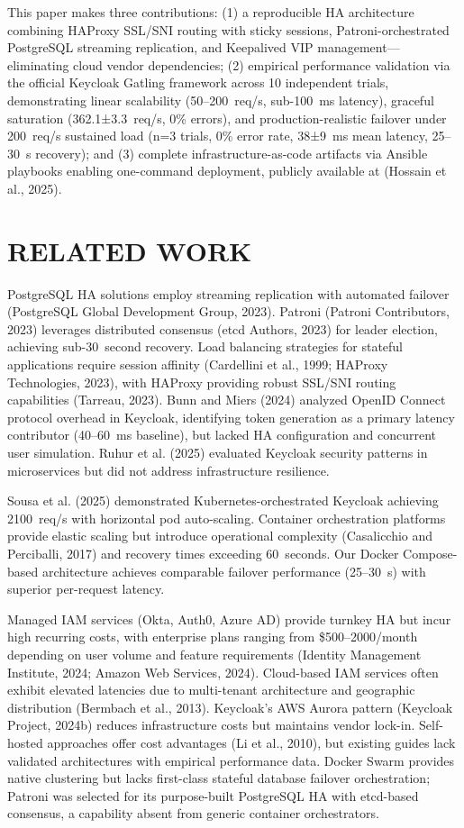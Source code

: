 \documentclass[a4paper,twoside]{article}
\begin{document}
This paper makes three contributions: (1) a reproducible HA architecture combining HAProxy SSL/SNI routing with sticky sessions, Patroni-orchestrated PostgreSQL streaming replication, and Keepalived VIP management---eliminating cloud vendor dependencies; (2) empirical performance validation via the official Keycloak Gatling framework across 10 independent trials, demonstrating linear scalability (50--200~req/s, sub-100~ms latency), graceful saturation (362.1±3.3~req/s, 0\% errors), and production-realistic failover under 200~req/s sustained load (n=3 trials, 0\% error rate, 38±9~ms mean latency, 25--30~s recovery); and (3) complete infrastructure-as-code artifacts via Ansible playbooks enabling one-command deployment, publicly available at (Hossain et al., 2025).

\section{\uppercase{Related Work}}
\label{sec:related}

PostgreSQL HA solutions employ streaming replication with automated failover (PostgreSQL Global Development Group, 2023). Patroni (Patroni Contributors, 2023) leverages distributed consensus (etcd Authors, 2023) for leader election, achieving sub-30~second recovery. Load balancing strategies for stateful applications require session affinity (Cardellini et al., 1999; HAProxy Technologies, 2023), with HAProxy providing robust SSL/SNI routing capabilities (Tarreau, 2023). Bunn and Miers (2024) analyzed OpenID Connect protocol overhead in Keycloak, identifying token generation as a primary latency contributor (40--60~ms baseline), but lacked HA configuration and concurrent user simulation. Ruhur et al. (2025) evaluated Keycloak security patterns in microservices but did not address infrastructure resilience.

Sousa et al. (2025) demonstrated Kubernetes-orchestrated Keycloak achieving 2100~req/s with horizontal pod auto-scaling. Container orchestration platforms provide elastic scaling but introduce operational complexity (Casalicchio and Perciballi, 2017) and recovery times exceeding 60~seconds. Our Docker Compose-based architecture achieves comparable failover performance (25--30~s) with superior per-request latency.

Managed IAM services (Okta, Auth0, Azure AD) provide turnkey HA but incur high recurring costs, with enterprise plans ranging from \$500--2000/month depending on user volume and feature requirements (Identity Management Institute, 2024; Amazon Web Services, 2024). Cloud-based IAM services often exhibit elevated latencies due to multi-tenant architecture and geographic distribution (Bermbach et al., 2013). Keycloak's AWS Aurora pattern (Keycloak Project, 2024b) reduces infrastructure costs but maintains vendor lock-in. Self-hosted approaches offer cost advantages (Li et al., 2010), but existing guides lack validated architectures with empirical performance data. Docker Swarm provides native clustering but lacks first-class stateful database failover orchestration; Patroni was selected for its purpose-built PostgreSQL HA with etcd-based consensus, a capability absent from generic container orchestrators.
\end{document}
